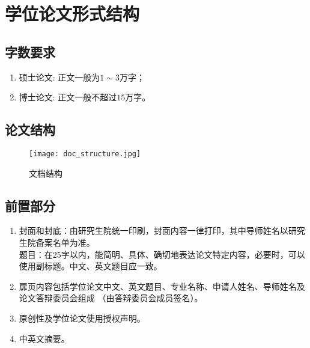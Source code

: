 
\chapter{学位论文形式结构}

\section{字数要求}
\begin{enumerate}
    \item 硕士论文: 正文一般为$1 \sim 3$万字；
    \item 博士论文: 正文一般不超过$15$万字。
\end{enumerate}

\section{论文结构}
\begin{figure}
    \centering
    \texttt{[image: doc\_structure.jpg]}
    \caption{文档结构}
\end{figure}

\section{前置部分}

\begin{enumerate}
    \item 封面和封底：由研究生院统一印刷，封面内容一律打印，其中导师姓名以研究生院备案名单为准。\\
          题目：在25字以内，能简明、具体、确切地表达论文特定内容，必要时，可以使用副标题。中文、英文题目应一致。
      \item 扉页内容包括学位论文中文、英文题目、专业名称、申请人姓名、导师姓名及论文答辩委员会组成 （由答辩委员会成员签名）。
      \item 原创性及学位论文使用授权声明。
      \item 中英文摘要。
\end{enumerate}


